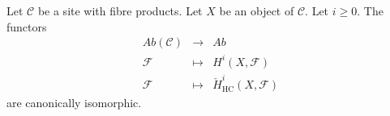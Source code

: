 %
\begin{theorem}
\label{theorem-cohomology-hypercoverings}
Let $\mathcal{C}$ be a site with fibre products.
Let $X$ be an object of $\mathcal{C}$. Let $i \geq 0$.
The functors
\begin{eqnarray*}
\textit{Ab}(\mathcal{C}) & \longrightarrow & \textit{Ab} \\
\mathcal{F} & \longmapsto & H^i(X, \mathcal{F}) \\
\mathcal{F} & \longmapsto & \check{H}^i_{\text{HC}}(X, \mathcal{F})
\end{eqnarray*}
are canonically isomorphic.
\end{theorem}

